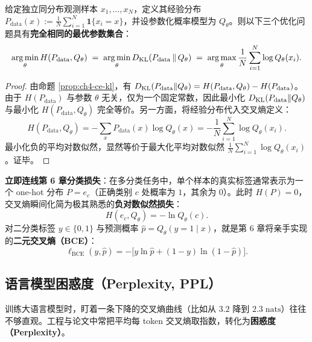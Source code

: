 \begin{thmBox}
\begin{theorem}
\label{thm:ch4-ce-kl-mle}
给定独立同分布观测样本 $x_1, \dots, x_N$，定义其经验分布 $P_{\mathrm{data}}(x) := \frac{1}{N}\sum_{i=1}^N \mathbf{1}\{x_i = x\}$，并设参数化概率模型为 $Q_\theta$。则以下三个优化问题具有\textbf{完全相同的最优参数集合}：
\begin{equation}
  \operatorname*{arg\,min}_\theta H(P_{\mathrm{data}}, Q_\theta)
  \;=\;
  \operatorname*{arg\,min}_\theta D_{\mathrm{KL}}(P_{\mathrm{data}} \,\|\, Q_\theta)
  \;=\;
  \operatorname*{arg\,max}_\theta \frac{1}{N}\sum_{i=1}^N \log Q_\theta(x_i). \label{eq:ch4-unifying}
\end{equation}
\end{theorem}
\end{thmBox}

\begin{proof}
由命题 \ref{prop:ch4-ce-kl}，有 $D_{\mathrm{KL}}(P_{\mathrm{data}} \| Q_\theta) = H(P_{\mathrm{data}}, Q_\theta) - H(P_{\mathrm{data}})$。由于 $H(P_{\mathrm{data}})$ 与参数 $\theta$ 无关，仅为一个固定常数，因此最小化 $D_{\mathrm{KL}}(P_{\mathrm{data}} \| Q_\theta)$ 与最小化 $H(P_{\mathrm{data}}, Q_\theta)$ 完全等价。另一方面，将经验分布代入交叉熵定义：
\[
  H(P_{\mathrm{data}}, Q_\theta)
  = -\sum_{x} P_{\mathrm{data}}(x)\log Q_\theta(x)
  = -\frac{1}{N}\sum_{i=1}^N \log Q_\theta(x_i).
\]
最小化负的平均对数似然，显然等价于最大化平均对数似然 $\frac{1}{N}\sum_{i=1}^N \log Q_\theta(x_i)$。证毕。
\end{proof}

\textbf{立即连线第 6 章分类损失}：在多分类任务中，单个样本的真实标签通常表示为一个 one-hot 分布 $P = e_c$（正确类别 $c$ 处概率为 $1$，其余为 $0$）。此时 $H(P) = 0$，交叉熵瞬间化简为极其熟悉的\textbf{负对数似然损失}：
\[
  H(e_c, Q_\theta) = -\ln Q_\theta(c).
\]
对二分类标签 $y \in \{0, 1\}$ 与预测概率 $\hat{p} = Q_\theta(y=1\mid x)$，就是第 6 章将亲手实现的\textbf{二元交叉熵（BCE）}：
\[
  \ell_{\mathrm{BCE}}(y, \hat{p}) = -\bigl[y\ln \hat{p} + (1 - y)\ln(1 - \hat{p})\bigr].
\]

\subsection{语言模型困惑度（Perplexity, PPL）}

训练大语言模型时，盯着一条下降的交叉熵曲线（比如从 $3.2$ 降到 $2.3\;\text{nats}$）往往不够直观。工程与论文中常把平均每 token 交叉熵取指数，转化为\textbf{困惑度（Perplexity）}。

